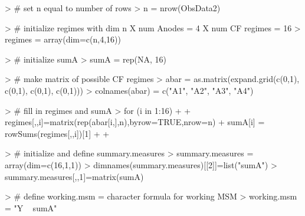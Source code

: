 \documentclass{exam}
\begin{document}
\begin{Schunk}
\begin{Sinput}
> # set n equal to number of rows
> n = nrow(ObsData2)
\end{Sinput}
\end{Schunk}
\begin{Schunk}
\begin{Sinput}
> # initialize regimes with dim n X num Anodes = 4 X num CF regimes = 16
> regimes = array(dim=c(n,4,16)) 
\end{Sinput}
\end{Schunk}
\begin{Schunk}
\begin{Sinput}
> # initialize sumA
> sumA = rep(NA, 16)
\end{Sinput}
\end{Schunk}
\begin{Schunk}
\begin{Sinput}
> # make matrix of possible CF regimes
> abar = as.matrix(expand.grid(c(0,1), c(0,1), c(0,1), c(0,1)))
> colnames(abar) = c("A1", "A2", "A3", "A4")
\end{Sinput}
\end{Schunk}
\begin{Schunk}
\begin{Sinput}
> # fill in regimes and sumA
> for (i in 1:16){
+   
+   regimes[,,i]=matrix(rep(abar[i,],n),byrow=TRUE,nrow=n)
+   sumA[i] = rowSums(regimes[,,i])[1]
+   
+ }
\end{Sinput}
\end{Schunk}
\begin{Schunk}
\begin{Sinput}
> # initialize and define summary.measures
> summary.measures = array(dim=c(16,1,1))
> dimnames(summary.measures)[[2]]=list("sumA")
> summary.measures[,,1]=matrix(sumA)
\end{Sinput}
\end{Schunk}
\begin{Schunk}
\begin{Sinput}
> # define working.msm = character formula for working MSM
> working.msm = "Y ~ sumA"
\end{Sinput}
\end{Schunk}
\end{document}
